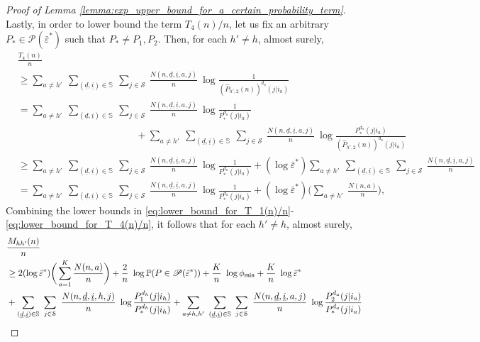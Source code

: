 \begin{proof}[Proof of Lemma \ref{lemma:exp_upper_bound_for_a_certain_probability_term}]
Lastly, in order to lower bound the term $T_4(n)/n$, let us fix an arbitrary $P_*\in \mathscr{P}(\bar{\varepsilon}^*)$ such that $P_*\neq P_1,P_2$. Then, for each $h'\neq h$, almost surely,
\begin{align}
	&\frac{T_4(n)}{n} \nonumber\\
	&\geq\sum\limits_{a\neq h'}~\sum\limits_{(\underline{d}, \underline{i})\in \mathbb{S}}~\sum\limits_{j\in \mathcal{S}}~\frac{N(n, \underline{d}, \underline{i}, a, j)}{n}~\log\frac{1}{(\hat{P}_{h', 2}(n))^{d_{a}}(j|i_{a})}\nonumber\\
	&=\sum\limits_{a\neq h'}~\sum\limits_{(\underline{d}, \underline{i})\in \mathbb{S}}~\sum\limits_{j\in \mathcal{S}}~\frac{N(n, \underline{d}, \underline{i}, a, j)}{n}~\log\frac{1}{P_*^{d_{a}}(j|i_{a})}\nonumber\\
	&\hspace{5cm}+\sum\limits_{a\neq h'}~\sum\limits_{(\underline{d}, \underline{i})\in \mathbb{S}}~\sum\limits_{j\in \mathcal{S}}~\frac{N(n, \underline{d}, \underline{i}, a, j)}{n}~\log\frac{P_*^{d_{a}}(j|i_{a})}{(\hat{P}_{h', 2}(n))^{d_{a}}(j|i_{a})}\nonumber\\
	&\geq \sum\limits_{a\neq h'}~\sum\limits_{(\underline{d}, \underline{i})\in \mathbb{S}}~\sum\limits_{j\in \mathcal{S}}~\frac{N(n, \underline{d}, \underline{i}, a, j)}{n}~\log\frac{1}{P_*^{d_{a}}(j|i_{a})} + (\log \bar{\varepsilon}^*)\sum\limits_{a\neq h'}~\sum\limits_{(\underline{d}, \underline{i})\in \mathbb{S}}~\sum\limits_{j\in \mathcal{S}}~\frac{N(n, \underline{d}, \underline{i}, a, j)}{n}\nonumber\\
	&=\sum\limits_{a\neq h'}~\sum\limits_{(\underline{d}, \underline{i})\in \mathbb{S}}~\sum\limits_{j\in \mathcal{S}}~\frac{N(n, \underline{d}, \underline{i}, a, j)}{n}~\log\frac{1}{P_*^{d_{a}}(j|i_{a})} + (\log \bar{\varepsilon}^*)\bigg(\sum\limits_{a\neq h'}~\frac{N(n, a)}{n}\bigg),
	\label{eq:lower_bound_for_T_4(n)/n}
\end{align}
Combining the lower bounds in \eqref{eq:lower_bound_for_T_1(n)/n}-\eqref{eq:lower_bound_for_T_4(n)/n}, it follows that for each $h'\neq h$, almost surely,
\begin{align}
	&\frac{M_{hh'}(n)}{n}\nonumber\\
	&\geq 2(\log \bar{\varepsilon}^*)\bigg(\sum\limits_{a=1}^{K}\frac{N(n, a)}{n}\bigg)+\frac{2}{n}~ \log \mathbb{P}(P\in \mathscr{P}(\bar{\varepsilon}^*))+{\color{black} \frac{K}{n}~ \log\phi_{\textsf{min}}}+\frac{K}{n}~ \log \bar{\varepsilon}^*\nonumber\\
	&+ \sum\limits_{(\underline{d}, \underline{i})\in \mathbb{S}}~\sum\limits_{j\in \mathcal{S}}~\frac{N(n, \underline{d}, \underline{i}, h, j)}{n}~\log \frac{P_1^{d_h}(j|i_h)}{P_*^{d_h}(j|i_h)} + \sum\limits_{a\neq h, h'}~\sum\limits_{(\underline{d}, \underline{i})\in \mathbb{S}}~\sum\limits_{j\in \mathcal{S}}~\frac{N(n, \underline{d}, \underline{i}, a, j)}{n}~\log \frac{P_2^{d_a}(j|i_a)}{P_*^{d_a}(j|i_a)}\nonumber\\

\end{align}
\end{proof}
